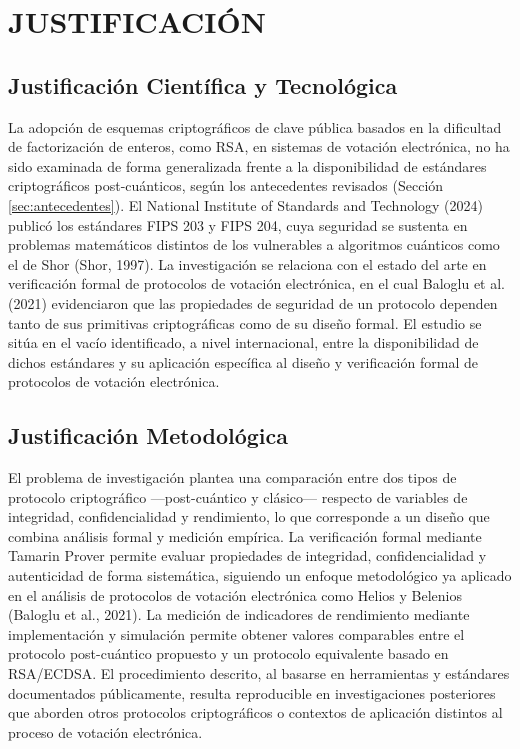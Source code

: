 \section{JUSTIFICACIÓN}

\subsection{Justificación Científica y Tecnológica}

La adopción de esquemas criptográficos de clave pública basados en la dificultad de factorización de enteros, como RSA, en sistemas de votación electrónica, no ha sido examinada de forma generalizada frente a la disponibilidad de estándares criptográficos post-cuánticos, según los antecedentes revisados (Sección \ref{sec:antecedentes}). El National Institute of Standards and Technology (2024) publicó los estándares FIPS 203 y FIPS 204, cuya seguridad se sustenta en problemas matemáticos distintos de los vulnerables a algoritmos cuánticos como el de Shor (Shor, 1997). La investigación se relaciona con el estado del arte en verificación formal de protocolos de votación electrónica, en el cual Baloglu et al. (2021) evidenciaron que las propiedades de seguridad de un protocolo dependen tanto de sus primitivas criptográficas como de su diseño formal. El estudio se sitúa en el vacío identificado, a nivel internacional, entre la disponibilidad de dichos estándares y su aplicación específica al diseño y verificación formal de protocolos de votación electrónica.

\subsection{Justificación Metodológica}

El problema de investigación plantea una comparación entre dos tipos de protocolo criptográfico —post-cuántico y clásico— respecto de variables de integridad, confidencialidad y rendimiento, lo que corresponde a un diseño que combina análisis formal y medición empírica. La verificación formal mediante Tamarin Prover permite evaluar propiedades de integridad, confidencialidad y autenticidad de forma sistemática, siguiendo un enfoque metodológico ya aplicado en el análisis de protocolos de votación electrónica como Helios y Belenios (Baloglu et al., 2021). La medición de indicadores de rendimiento mediante implementación y simulación permite obtener valores comparables entre el protocolo post-cuántico propuesto y un protocolo equivalente basado en RSA/ECDSA. El procedimiento descrito, al basarse en herramientas y estándares documentados públicamente, resulta reproducible en investigaciones posteriores que aborden otros protocolos criptográficos o contextos de aplicación distintos al proceso de votación electrónica.

